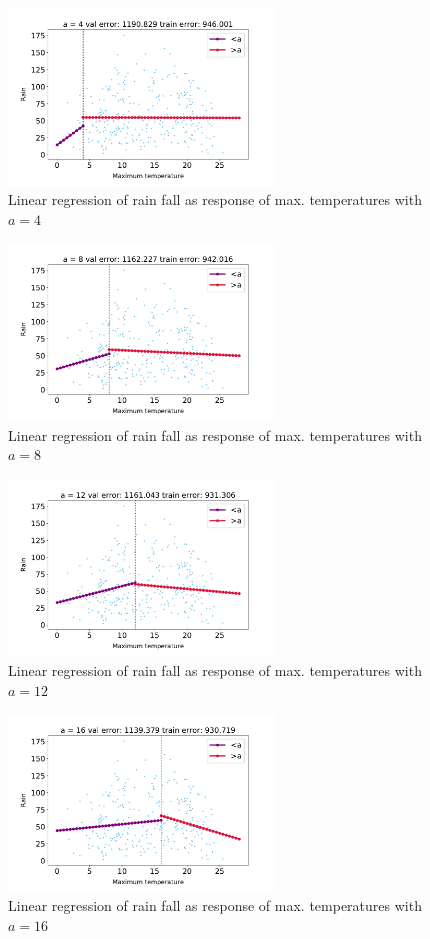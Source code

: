\documentclass[12pt,twoside]{article}
\begin{document}
\begin{enumerate}
\begin{enumerate}
	\begin{figure}[H]
		\centering
		\includegraphics[width=200pt]{figures/a=4.pdf}
		\caption{Linear regression of rain fall as response of max. temperatures with $a=4$}
		\label{fig1}
	\end{figure}

	\begin{figure}[H]
		\centering
		\includegraphics[width=200pt]{figures/a=8.pdf}
		\caption{Linear regression of rain fall as response of max. temperatures with $a=8$}
		\label{fig2}
	\end{figure}

	\begin{figure}[H]
		\centering
		\includegraphics[width=200pt]{figures/a=12.pdf}
		\caption{Linear regression of rain fall as response of max. temperatures with $a=12$}
		\label{fig3}
	\end{figure}

	\begin{figure}[H]
		\centering
		\includegraphics[width=200pt]{figures/a=16.pdf}
		\caption{Linear regression of rain fall as response of max. temperatures with $a=16$}
		\label{fig4}
	\end{figure}


\end{enumerate}
\end{enumerate}
\end{document}
